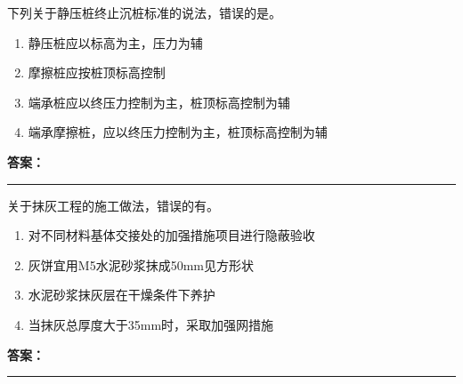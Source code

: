 \documentclass[UTF8,fontset=fandol,11pt]{ctexart}
\newcommand{\answerline}{\textcolor{answerred}{\rule{2.4cm}{0.7pt}}}
\begin{document}
\vspace{0.2em}

\begin{quizbox}[title={乱序第 11 题｜第二章桩基础工程}]

下列关于静压桩终止沉桩标准的说法，错误的是。\\

\begin{enumerate}[label=\Alph*.]

\item 静压桩应以标高为主，压力为辅

\item 摩擦桩应按桩顶标高控制

\item 端承桩应以终压力控制为主，桩顶标高控制为辅

\item 端承摩擦桩，应以终压力控制为主，桩顶标高控制为辅

\end{enumerate}

\textbf{\textcolor{answerred}{答案：}} \answerline

\end{quizbox}

\vspace{0.2em}

\begin{quizbox}[title={乱序第 12 题｜第八章装饰工程（抹灰工程）}]

关于抹灰工程的施工做法，错误的有。\\

\begin{enumerate}[label=\Alph*.]

\item 对不同材料基体交接处的加强措施项目进行隐蔽验收

\item 灰饼宜用M5水泥砂浆抹成50mm见方形状

\item 水泥砂浆抹灰层在干燥条件下养护

\item 当抹灰总厚度大于35mm时，采取加强网措施

\end{enumerate}

\textbf{\textcolor{answerred}{答案：}} \answerline

\end{quizbox}

\vspace{0.2em}
\end{document}

